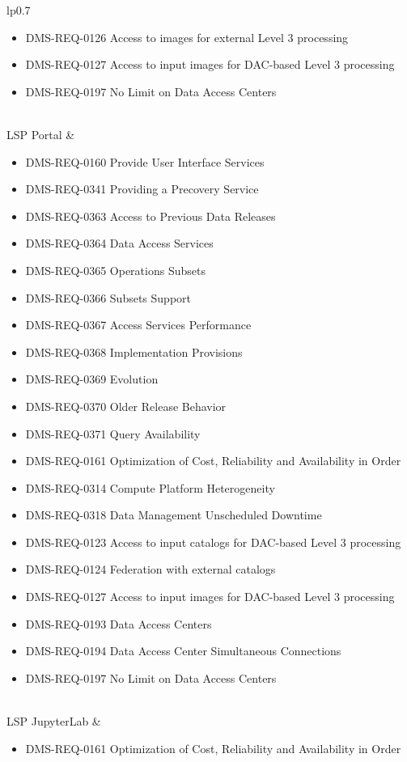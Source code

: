 \begin{xtabular}{lp{0.7\textwidth}}
\begin{itemize}
\item DMS-REQ-0126 Access to images for external Level 3 processing
\item DMS-REQ-0127 Access to input images for DAC-based Level 3 processing
\item DMS-REQ-0197 No Limit on Data Access Centers
\end{itemize} \\ \hline
LSP Portal &
\begin{itemize}DMS-REQ-0119 DAC resource allocation for Level 3 processing
\item DMS-REQ-0160 Provide User Interface Services
\item DMS-REQ-0341 Providing a Precovery Service
\item DMS-REQ-0363 Access to Previous Data Releases
\item DMS-REQ-0364 Data Access Services
\item DMS-REQ-0365 Operations Subsets
\item DMS-REQ-0366 Subsets Support
\item DMS-REQ-0367 Access Services Performance
\item DMS-REQ-0368 Implementation Provisions
\item DMS-REQ-0369 Evolution
\item DMS-REQ-0370 Older Release Behavior
\item DMS-REQ-0371 Query Availability
\item DMS-REQ-0161 Optimization of Cost, Reliability and Availability in Order
\item DMS-REQ-0314 Compute Platform Heterogeneity
\item DMS-REQ-0318 Data Management Unscheduled Downtime
\item DMS-REQ-0123 Access to input catalogs for DAC-based Level 3 processing
\item DMS-REQ-0124 Federation with external catalogs
\item DMS-REQ-0127 Access to input images for DAC-based Level 3 processing
\item DMS-REQ-0193 Data Access Centers
\item DMS-REQ-0194 Data Access Center Simultaneous Connections
\item DMS-REQ-0197 No Limit on Data Access Centers
\end{itemize} \\ \hline
LSP JupyterLab &
\begin{itemize}DMS-REQ-0119 DAC resource allocation for Level 3 processing
\item DMS-REQ-0161 Optimization of Cost, Reliability and Availability in Order

\end{itemize}
\end{xtabular}

